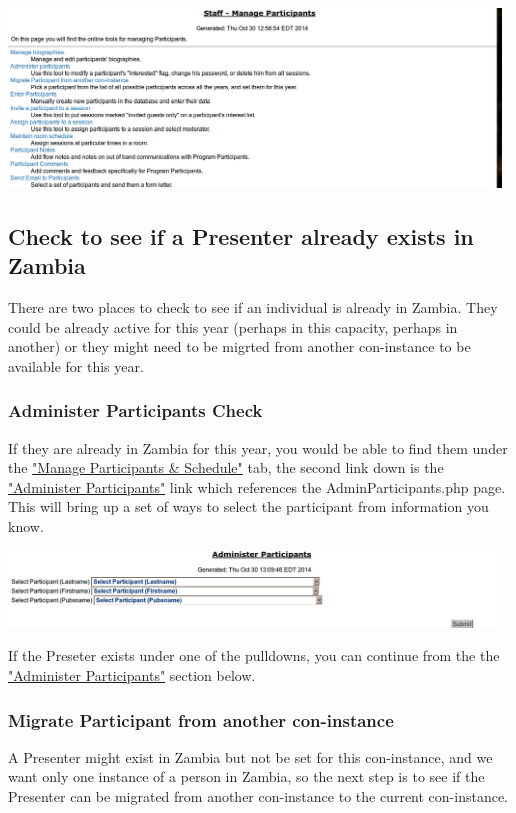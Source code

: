 \documentclass[captions=tablesignature]{scrartcl}
\begin{document}
\includegraphics[width=0.98\textwidth]{./Images/Manage_Participants.png}

\subsection{Check to see if a Presenter already exists in Zambia}
\label{sec-2-1}

There are two places to check to see if an individual is already in
Zambia.  They could be already active for this year (perhaps in
this capacity, perhaps in another) or they might need to be migrted
from another con-instance to be available for this year.

\subsubsection{Administer Participants Check}
\label{sec-2-1-1}
If they are already in Zambia for this year, you would be able to
find them under the \hyperref[sec-2]{"Manage Participants \& Schedule"} tab, the
second link down is the \hyperref[sec-3]{"Administer Participants"} link which
references the AdminParticipants.php page.  This will bring up a
set of ways to select the participant from information you know.

\includegraphics[width=0.98\textwidth]{./Images/Administer_Participants_Header.png}

If the Preseter exists under one of the pulldowns, you can
continue from the the \hyperref[sec-3]{"Administer Participants"} section below.
\subsubsection{Migrate Participant from another con-instance}
\label{sec-2-1-2}
A Presenter might exist in Zambia but not be set for this
con-instance, and we want only one instance of a person in Zambia,
so the next step is to see if the Presenter can be migrated from
another con-instance to the current con-instance.
\end{document}
